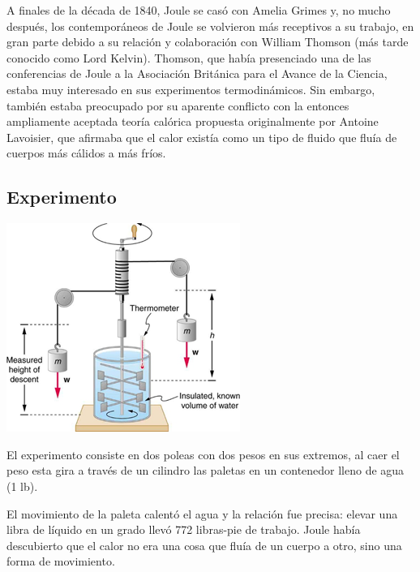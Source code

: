 \documentclass[letterpaper, 10pt, journal]{IEEEtran}
\begin{document}
A finales de la década de 1840, Joule se casó con Amelia Grimes y, no mucho después, los contemporáneos de Joule se volvieron más receptivos a su trabajo, en gran parte debido a su relación y colaboración con William Thomson (más tarde conocido como Lord Kelvin). Thomson, que había presenciado una de las conferencias de Joule a la Asociación Británica para el Avance de la Ciencia, estaba muy interesado en sus experimentos termodinámicos. Sin embargo, también estaba preocupado por su aparente conflicto con la entonces ampliamente aceptada teoría calórica propuesta originalmente por Antoine Lavoisier, que afirmaba que el calor existía como un tipo de fluido que fluía de cuerpos más cálidos a más fríos.

\subsection{Experimento}
\includegraphics[scale=1.5]{paletas}

El experimento consiste en dos poleas con dos pesos en sus extremos, al caer el peso esta gira a través de un cilindro las paletas en un contenedor lleno de agua (1 lb).

El movimiento de la paleta calentó el agua y la relación fue precisa: elevar una libra de líquido en un grado llevó 772 libras-pie de trabajo. Joule había descubierto que el calor no era una cosa que fluía de un cuerpo a otro, sino una forma de movimiento.
\end{document}

